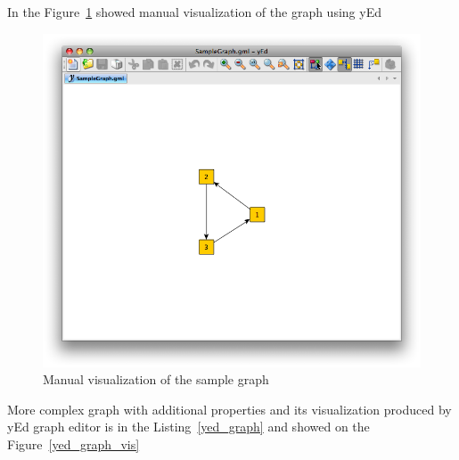\documentclass[a4paper,oneside]{article}
\newcommand{\codefile}[3]{
	\begin{center}
		
	\end{center}
}
\begin{document}
\codefile{GML description of sample graph}{sample_graph_gml}{SampleGraph.gml}


In the Figure~\ref{sample_graph_yed_vis} showed manual visualization of the graph using yEd~\cite{yed}


\begin{center}
\begin{figure}
	\includegraphics[scale=0.5]{SampleGraph.png}
	\caption{Manual visualization of the sample graph}
	\label{sample_graph_yed_vis}
\end{figure}
\end{center}


More complex graph with additional properties and its visualization produced by yEd graph editor is in the Listing~\ref{yed_graph} and showed on the Figure~\ref{yed_graph_vis}


\codefile{GML graph with additional properties}{yed_graph}{YedGraph.gml}
\end{document}
